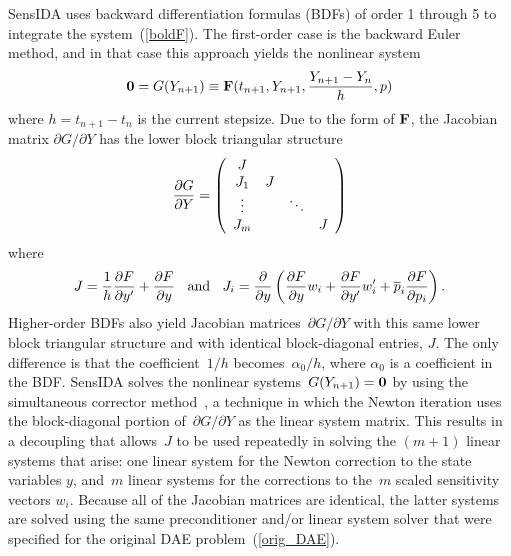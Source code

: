 SensIDA uses backward differentiation formulas (BDFs) of order 1
through 5 to integrate the system~(\ref{boldF}).
The first-order case is the backward Euler method, and in that case
this approach yields the nonlinear system
\begin{equation}
{\bf 0} = G(Y_{n+1}) \equiv 
{\bf F}(t_{n+1},Y_{n+1},\frac{Y_{n+1}-Y_{n}}{h},p)
\label{G_eqns}
\end{equation}
where $h = t_{n+1}-t_{n}$ is the current stepsize.
Due to the form of ${\bf F}$, the Jacobian matrix $\partial G/\partial Y$
has the lower block triangular structure
\[
\frac{\partial G}{\partial Y} =
\left( \begin{array}{cccc}
J & & &  \\
J_1 & J &  & \\
\vdots &  & \ddots & \\
J_m &  & & J \end{array} \right)
\]
where 
\[
J = \frac{1}{h} \frac{\partial F}{\partial y^{\prime}} + \frac{\partial F}{\partial y} \;\; \mbox{ and } \;\;
J_i = \frac{\partial}{\partial y} \left(\frac{\partial F}{\partial y} w_i + \frac{\partial F}{\partial y^{\prime}} w^{\prime}_i +
\overline{p}_i \frac{\partial F}{\partial p_i}\right).
\]
Higher-order BDFs also yield Jacobian matrices~$\partial G/\partial Y$
with this same lower block triangular structure and with identical
block-diagonal entries, $J$.
The only difference is that the coefficient~$1/h$
becomes~$\alpha_0/h$, where $\alpha_0$ is a coefficient in the
BDF.
SensIDA solves the nonlinear systems~$G(Y_{n+1})={\bf 0}$ by using
the simultaneous corrector method~\cite{MP96}, a technique in which
the Newton iteration uses the block-diagonal portion of~$\partial
G/\partial Y$ as the linear system matrix.
This results in a decoupling that allows~$J$ to be used
repeatedly in solving the $(m+1)$ linear systems that arise: one linear
system for the Newton correction to the state variables $y$, and~$m$ linear
systems for the corrections to the~$m$ scaled sensitivity vectors $w_i$.
Because all of the Jacobian matrices are identical, the latter systems are
solved using the same preconditioner and/or linear system solver that
were specified for the original DAE problem~(\ref{orig_DAE}).

